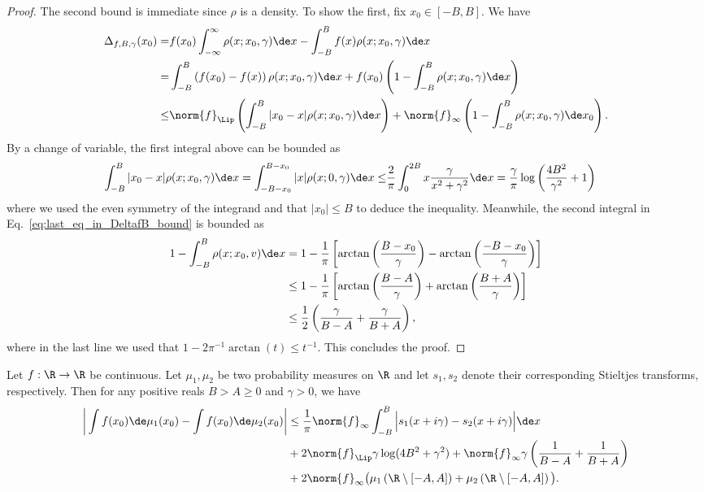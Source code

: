 \begin{proof}
The second bound is immediate since $\rho$ is a density. 
To show the first, fix $x_0\in[-B,B]$. We have
    \begin{align}
    \nonumber
        \Delta_{ f,B,\gamma}(x_0) =&  f(x_0)\int_{-\infty}^\infty\rho(x;x_0,\gamma)\de x
        -\int_{-B}^B  f(x) \rho(x;x_0,\gamma)\de x\\
        \nonumber
        =&\int_{-B}^B \left(f(x_0)-f(x) \right) \rho(x;x_0,\gamma)\de x +  f(x_0)\left(1-\int_{-B}^{B} \rho(x;x_0,\gamma)\de x\right)\\
        \leq & \norm{f}_{\Lip}\left(\int_{-B}^B |x_0-x|\rho(x;x_0,\gamma)\de x\right)
        +\norm{f}_\infty\left(1-\int_{-B}^B \rho(x;x_0,\gamma)\de x_0\right).
        \label{eq:last_eq_in_DeltafB_bound}
    \end{align}
    By a change of variable, the first integral above can be bounded as
    \begin{align*}
        \int_{-B}^B |x_0-x|\rho(x;x_0,\gamma)\de x = 
        \int_{-B-x_0}^{B-x_0} |x|\rho(x;0,\gamma)\de x
        \leq& \frac{2}{\pi}\int_{0}^{2B} x \frac{\gamma}{x^2+\gamma^2}\de x
        = \frac{\gamma}{\pi}\log\left(\frac{4B^2}{\gamma^2} + 1\right)
    \end{align*}
where we used the even symmetry of the integrand and that $|x_0 | \le B$ to deduce the inequality.
Meanwhile, the second integral in Eq.~\eqref{eq:last_eq_in_DeltafB_bound} is bounded as
    \begin{align*}
        1-\int_{-B}^B \rho(x;x_0,v)\de x
        &= 1- \frac{1}{\pi }\left[\arctan \left( \frac{B-x_0}{\gamma}\right) - \arctan \left( \frac{-B-x_0}{\gamma}\right)\right]\\
        &\le  1- \frac{1}{\pi }\left[\arctan \left( \frac{B-A}{\gamma}\right) + \arctan \left( \frac{B+A}{\gamma}\right)\right]\\
        &\le
        \frac12 \left( \frac{\gamma}{B-A}  + \frac{\gamma}{B+A}\right),
    \end{align*}
   where in the last line we used that $1 -2\pi^{-1}\arctan(t) \le t^{-1}$. This concludes the proof.
\end{proof}
\begin{lemma}
Let $f:\R\to\R$ be continuous. Let $\mu_1,\mu_2$ be two probability measures on $\R$ and let $s_1,s_2$ denote their corresponding Stieltjes transforms, respectively.
Then for any positive reals $B > A \ge 0$ and $\gamma  > 0$, we have
    \begin{align*}
         \bigg|\int f(x_0)\de\mu_1(x_0) - \int f(x_0)\de\mu_2(x_0)\bigg| &\le
        \frac1\pi \norm{f}_\infty \int_{-B}^B \Big|s_1(x+i\gamma)-s_2(x+i\gamma)\Big|\de x\\
&+2\norm{f}_{\Lip} \gamma\log(4B^2+\gamma^2)
        +\norm{f}_\infty \gamma \left(\frac1{B-A} + \frac1{B+A}\right)\\
&+2 \norm{f}_\infty \big(\mu_1\left(\R \setminus [-A,A]\right) + \mu_2\left(\R \setminus [-A,A]\right)\big).
     \end{align*} 
\end{lemma}


